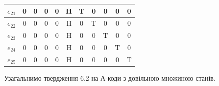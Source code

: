 \begin{example}
\begin{center}
\begin{tabular}{|c|c|c|c|c|c|c|c|c|c|c|}
            $e_{21}$ & 0 & 0 & 0 & 0 & H & T & 0 & 0 & 0 & 0 \\\hline
            $e_{22}$ & 0 & 0 & 0 & 0 & H & 0 & T & 0 & 0 & 0 \\\hline
            $e_{23}$ & 0 & 0 & 0 & 0 & H & 0 & 0 & T & 0 & 0 \\\hline
            $e_{24}$ & 0 & 0 & 0 & 0 & H & 0 & 0 & 0 & T & 0 \\\hline
            $e_{25}$ & 0 & 0 & 0 & 0 & H & 0 & 0 & 0 & 0 & T \\\hline
        \end{tabular}
    \end{center}
    
    Узагальнимо твердження 6.2 на А-коди з довільною множиною станів.
\end{example}

